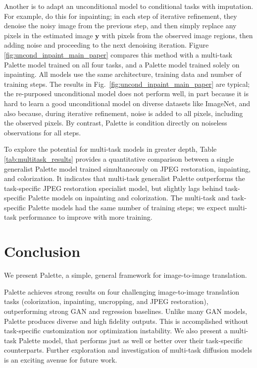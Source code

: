 Another is to adapt an unconditional model to conditional tasks with imputation. For example, \cite{song-iclr-2021} do this for inpainting; in each step of iterative refinement, they denoise the noisy image from the previous step, and then simply replace any pixels in the estimated image ${\bm{y}}$ with pixels from the observed image regions, then adding noise and proceeding to the next denoising iteration. Figure \ref{fig:uncond_inpaint_main_paper} compares this method  with a multi-task Palette model trained on all four tasks, and a Palette model trained solely on inpainting.  All models use the same architecture, training data and number of training steps. The results in Fig.\ \ref{fig:uncond_inpaint_main_paper} are typical; the re-purposed unconditional model does not perform well, in part because it is hard to learn a good unconditional model on diverse datasets like ImageNet, and also because, during iterative refinement, noise is added to all pixels, including the observed pixels.  By contrast, Palette is condition directly on noiseless observations for all steps.

To explore the potential for multi-task models in greater depth, Table \ref{tab:multitask_results}
provides a quantitative comparison between a single generalist Palette model trained simultaneously on JPEG restoration, inpainting, and colorization. It indicates that multi-task generalist Palette outperforms the task-specific JPEG restoration specialist model, but slightly lags behind task-specific Palette models on inpainting and colorization. The multi-task and task-specific Palette models had the same number of training steps; we expect multi-task  performance to improve with more training.

\section{Conclusion}

We present Palette, a simple, general framework for image-to-image translation.

Palette achieves strong results on four challenging image-to-image translation tasks (colorization, inpainting, uncropping, and JPEG restoration), outperforming strong GAN and regression baselines. Unlike many GAN models, Palette produces diverse and high fidelity outputs. This is accomplished without task-specific customization nor optimization instability. We also present a multi-task Palette model, that performs just as well or better over their task-specific counterparts. Further exploration and investigation of multi-task diffusion models is an exciting avenue for future work. 

